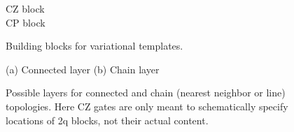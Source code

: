 \documentclass[draft, twocolumn, amsfonts, amssymb, aps, nofootinbib]{revtex4-2}
\newcommand{\CZ}{\textsf{CZ }}
\newcommand{\CP}{\textsf{CP }}
\begin{document}
\begin{figure}
	\begin{flushleft}
		\quad 	\CZ block
		\\
		\quad \CP block
	\end{flushleft}
	\caption{Building blocks for variational templates.  }
	\label{fig blocks}
\end{figure}
\begin{figure}
	(a)	Connected layer \qquad\qquad(b) Chain layer
	\\
	\qquad\qquad
	\caption{Possible layers for connected and chain (nearest neighbor or line) topologies. Here \CZ gates are only meant to schematically specify locations of 2q blocks, not their actual content. }
	\label{fig layers}
\end{figure}
\end{document}
